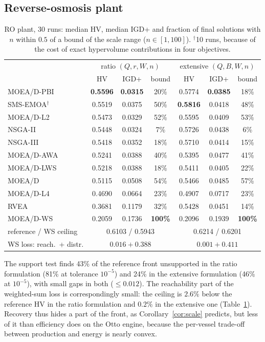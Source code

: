 \documentclass[journal]{IEEEtran}
\theoremstyle{remark}
\begin{document}
\subsection{Reverse-osmosis plant}

\begin{table}[t]
\caption{RO plant, 30 runs: median HV, median IGD+ and fraction of final solutions with $n$ within
$0.5$ of a bound of the scale range ($n \in [1,100]$). $^\dagger$10 runs, because of the cost of exact
hypervolume contributions in four objectives.}
\label{tab:ro}
\centering
\footnotesize
\setlength{\tabcolsep}{3.0pt}
\begin{tabular}{lcccccc}
\toprule
 & \multicolumn{3}{c}{ratio $(Q,r,W,n)$} & \multicolumn{3}{c}{extensive $(Q,B,W,n)$}\\
 & HV & IGD+ & bound & HV & IGD+ & bound\\
\midrule
MOEA/D-PBI & \textbf{0.5596} & \textbf{0.0315} & 20\% & 0.5774 & \textbf{0.0385} & 18\%\\
SMS-EMOA$^\dagger$ & 0.5519 & 0.0375 & 50\% & \textbf{0.5816} & 0.0418 & 48\%\\
MOEA/D-L2 & 0.5473 & 0.0329 & 52\% & 0.5595 & 0.0409 & 53\%\\
NSGA-II & 0.5448 & 0.0324 & 7\% & 0.5726 & 0.0438 & 6\%\\
NSGA-III & 0.5418 & 0.0352 & 18\% & 0.5710 & 0.0414 & 15\%\\
MOEA/D-AWA & 0.5241 & 0.0388 & 40\% & 0.5395 & 0.0477 & 41\%\\
MOEA/D-LWS & 0.5218 & 0.0388 & 18\% & 0.5411 & 0.0405 & 22\%\\
MOEA/D & 0.5115 & 0.0508 & 54\% & 0.5466 & 0.0485 & 57\%\\
MOEA/D-L4 & 0.4690 & 0.0664 & 23\% & 0.4907 & 0.0717 & 23\%\\
RVEA & 0.3681 & 0.1179 & 32\% & 0.5428 & 0.0451 & 14\%\\
MOEA/D-WS & 0.2059 & 0.1736 & \textbf{100\%} & 0.2096 & 0.1939 & \textbf{100\%}\\
\midrule
reference / WS ceiling & \multicolumn{3}{c}{0.6103 / 0.5943} & \multicolumn{3}{c}{0.6214 / 0.6201}\\
WS loss: reach.\ + distr. & \multicolumn{3}{c}{$0.016 + 0.388$} & \multicolumn{3}{c}{$0.001 + 0.411$}\\
\bottomrule
\end{tabular}
\end{table}

The support test finds 43\% of the reference front unsupported in the ratio formulation (81\% at
tolerance $10^{-5}$) and 24\% in the extensive formulation (46\% at $10^{-5}$), with small gaps in both
($\le 0.012$). The reachability part of the weighted-sum loss is correspondingly small: the ceiling is
$2.6\%$ below the reference HV in the ratio formulation and $0.2\%$ in the extensive one
(Table~\ref{tab:ro}). Recovery thus hides a part of the front, as Corollary~\ref{cor:scale} predicts,
but less of it than efficiency does on the Otto engine, because the per-vessel trade-off between
production and energy is nearly convex.
\end{document}
